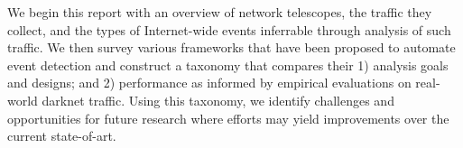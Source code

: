 \documentclass[manuscript,nonacm]{acmart}
\begin{document}





We begin this report with an overview of network telescopes, the traffic they collect, and the types of Internet-wide events inferrable through analysis of such traffic.
We then survey various frameworks that have been proposed to automate event detection and construct a taxonomy that compares their 1) analysis goals and designs; and 2) performance as informed by empirical evaluations on real-world darknet traffic.
Using this taxonomy, we identify challenges and opportunities for future research where efforts may yield improvements over the current state-of-art.
\end{document}
